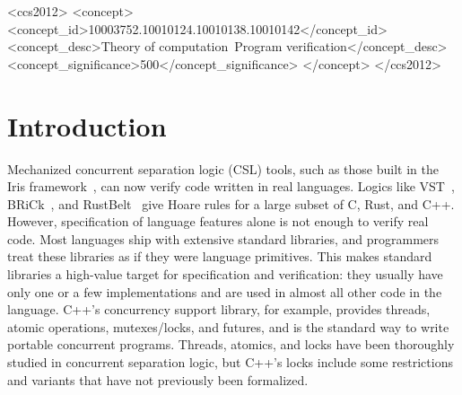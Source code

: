 \documentclass[acmsmall,screen,review,anonymous]{acmart}
\begin{document}
\begin{CCSXML}
<ccs2012>
<concept>
<concept_id>10003752.10010124.10010138.10010142</concept_id>
<concept_desc>Theory of computation~Program verification</concept_desc>
<concept_significance>500</concept_significance>
</concept>
</ccs2012>
\end{CCSXML}



\maketitle

\section{Introduction}
Mechanized concurrent separation logic (CSL) tools, such as those built in the Iris framework~\cite{iris}, can now verify code written in real languages. Logics like VST~\cite{vst}, BRiCk~\cite{brick}, and RustBelt~\cite{rustbelt} give Hoare rules for a large subset of C, Rust, and C++. However, specification of language features alone is not enough to verify real code. Most languages ship with extensive standard libraries, and programmers treat these libraries as if they were language primitives. This makes standard libraries a high-value target for specification and verification: they usually have only one or a few implementations and are used in almost all other code in the language. C++'s concurrency support library, for example, provides threads, atomic operations, mutexes/locks, and futures, and is the standard way to write portable concurrent programs. Threads, atomics, and locks have been thoroughly studied in concurrent separation logic, but C++'s locks include some restrictions and variants that have not previously been formalized.
\end{document}
